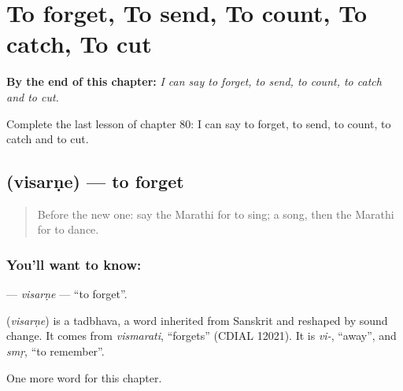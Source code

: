 
\chapter{To forget, To send, To count, To catch, To cut}
\label{ch:mr-to-forget-to-send-to-count-to-catch-to-cut}

\begin{chapteropening}
\textbf{By the end of this chapter:} \emph{I can say to forget, to send, to count, to catch and to cut.}

Complete the last lesson of chapter 80: I can say to forget, to send, to count, to catch and to cut.
\end{chapteropening}

\section[\texorpdfstring{\mr{विसरणे} (visarṇe)}{विसरणे (visarṇe)}]{ (visarṇe) — to forget}

\label{lesson:MR-C80-visarne}



\begin{quote}
Before the new one: say the Marathi for to sing; a song, then the Marathi for to dance.
\end{quote}

\subsection*{You'll want to know: }
\textbf{} — \emph{visarṇe} — \textquotedblleft{}to forget\textquotedblright{}.

\begin{cousinweb}
\textbf{} (\emph{visarṇe}) is a tadbhava, a word inherited from Sanskrit and reshaped by sound change. It comes from \emph{vismarati}, \textquotedblleft{}forgets\textquotedblright{} (CDIAL 12021). It is \emph{vi-}, \textquotedblleft{}away\textquotedblright{}, and \emph{smṛ}, \textquotedblleft{}to remember\textquotedblright{}.
\end{cousinweb}

\begin{grammarlens}[title={What you've built}]
One more word for this chapter.
\end{grammarlens}


